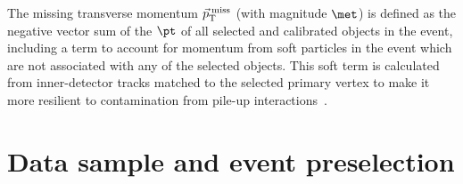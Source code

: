 \documentclass[PAPER, coverpage, atlasdraft=true, texlive=2016, UKenglish]{\ATLASLATEXPATH atlasdoc}
\begin{document}


The missing transverse momentum $\vec{p}_\textrm{T}^\textrm{\;miss}$ (with magnitude $\met$) is defined as the negative vector sum of the 
$\pt$ of all selected and calibrated objects in the event, including a term to account for momentum from soft particles 
in the event which are not associated with any of the selected objects. 
This soft term is calculated from inner-detector tracks matched to the selected primary vertex to make it more resilient to
contamination from pile-up interactions~\cite{Aaboud:2018tkc}.




\section{Data sample and event preselection}
\label{sec:data_presel}
\end{document}
